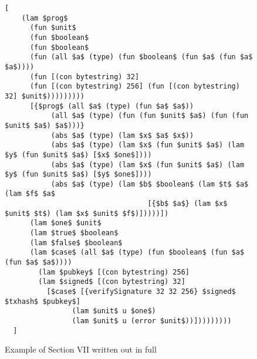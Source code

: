 \documentclass[../main.tex]{subfiles}
\begin{document}
\begin{figure*}
\begin{lstlisting}[basicstyle=\ttfamily,mathescape]
  [
    (lam $prog$
      (fun $unit$ 
      (fun $boolean$
      (fun $boolean$
      (fun (all $a$ (type) (fun $boolean$ (fun $a$ (fun $a$ $a$))))
      (fun [(con bytestring) 32]
      (fun [(con bytestring) 256] (fun [(con bytestring) 32] $unit$)))))))))
      [{$prog$ (all $a$ (type) (fun $a$ $a$))
           (all $a$ (type) (fun (fun $unit$ $a$) (fun (fun $unit$ $a$) $a$)))}
           (abs $a$ (type) (lam $x$ $a$ $x$))
           (abs $a$ (type) (lam $x$ (fun $unit$ $a$) (lam $y$ (fun $unit$ $a$) [$x$ $one$])))
           (abs $a$ (type) (lam $x$ (fun $unit$ $a$) (lam $y$ (fun $unit$ $a$) [$y$ $one$])))
           (abs $a$ (type) (lam $b$ $boolean$ (lam $t$ $a$ (lam $f$ $a$
                                  [{$b$ $a$} (lam $x$ $unit$ $t$) (lam $x$ $unit$ $f$)]))))])
      (lam $one$ $unit$
      (lam $true$ $boolean$
      (lam $false$ $boolean$
      (lam $case$ (all $a$ (type) (fun $boolean$ (fun $a$ (fun $a$ $a$))))
        (lam $pubkey$ [(con bytestring) 256]
        (lam $signed$ [(con bytestring) 32]
          [$case$ [{verifySignature 32 32 256} $signed$ $txhash$ $pubkey$]
                (lam $unit$ u $one$)
                (lam $unit$ u (error $unit$))]))))))))
  ]
\end{lstlisting}
\caption{Example of Section VII written out in full}
\label{fig:Continuized_Let_Example}
\end{figure*}





\end{document}

